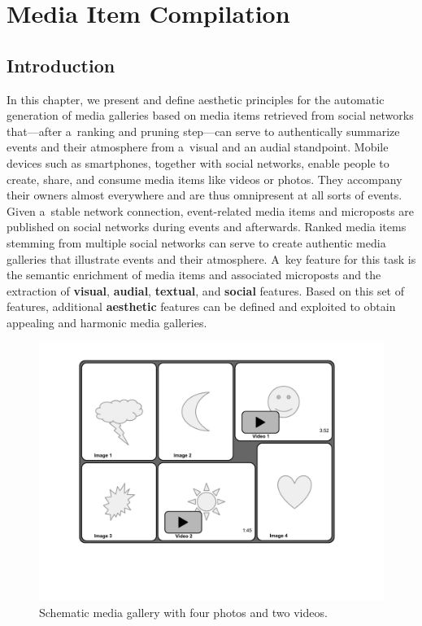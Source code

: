 \chapter{Media Item Compilation}

\ifpdf
    \graphicspath{{8_media_item_compilation/figures/PNG/}{8_media_item_compilation/figures/PDF/}{8_media_item_compilation/figures/}}
\else
    \graphicspath{{8_media_item_compilation/figures/EPS/}{8_media_item_compilation/figures/}}
\fi

\section{Introduction}

In this chapter, we present and define aesthetic principles
for the automatic generation of media galleries
based on media items retrieved from social networks
that---after a~ranking and pruning step---can serve to authentically
summarize events and their atmosphere from a~visual
and an audial standpoint.
Mobile devices such as smartphones, together with social networks,
enable people to create, share, and consume media items
like videos or photos.
They accompany their owners almost everywhere
and are thus omnipresent at all sorts of events.
Given a~stable network connection, event-related media items
and microposts are published on social networks
during events and afterwards.
Ranked media items stemming from multiple social networks
can serve to create authentic media galleries
that illustrate events and their atmosphere.
A~key feature for this task is the semantic enrichment
of media items and associated microposts
and the extraction of \textbf{visual}, \textbf{audial},
\textbf{textual}, and \textbf{social} features.
Based on this set of features,
additional \textbf{aesthetic} features
can be defined and exploited to obtain appealing
and harmonic media galleries.

\begin{figure}[htb]
  \centering
  \includegraphics[trim=20mm 40mm 20mm 10mm, clip, width=0.75\columnwidth]{media-gallery.pdf}
  \caption{Schematic media gallery with four photos and two videos.}
  \label{fig:media-gallery}
\end{figure}

